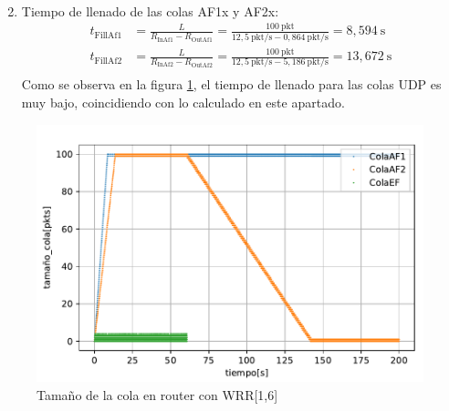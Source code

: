 \begin{enumerate}
\[\begin{aligned}
        \end{aligned}
    \]
    \item Tiempo de llenado de las colas AF1x y AF2x:
    \[
        \begin{aligned}
            t_{\text{FillAf1}} &= \frac{L}{R_{\text{InAf1}} - R_{\text{OutAf1}}} = \frac{100~\text{pkt}}{12,5~\text{pkt/s} - 0,864~\text{pkt/s}} = 8,594~\text{s} \\
            t_{\text{FillAf2}} &= \frac{L}{R_{\text{InAf2}} - R_{\text{OutAf2}}} = \frac{100~\text{pkt}}{12,5~\text{pkt/s} - 5,186~\text{pkt/s}} = 13,672~\text{s} \\
        \end{aligned}
    \]
    Como se observa en la figura \ref{fig:wrr16_tam}, el tiempo de llenado para las colas UDP es muy 
    bajo, coincidiendo con lo calculado en este apartado.
\end{enumerate}
\begin{figure}[!ht]
    \centering
    \includegraphics{graficas/WRR/tamao_cola_wrr.pdf}
    \caption{Tamaño de la cola en router con WRR[1,6]}
    \label{fig:wrr16_tam}
\end{figure}

\vspace{0,3cm}

